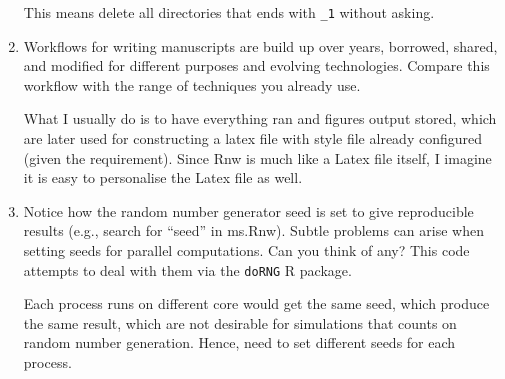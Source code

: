 \documentclass[12pt]{article}\usepackage[]{graphicx}\usepackage[]{color}
\begin{document}
\begin{enumerate}
This means delete all directories that ends with \texttt{\_1} without asking.

\item Workflows for writing manuscripts are build up over years, borrowed, shared, and modified for different purposes and evolving technologies. Compare this workflow with the range of techniques you already use.

What I usually do is to have everything ran and figures output stored, which are later used for constructing a latex file with style file already configured (given the requirement). Since Rnw is much like a Latex file itself, I imagine it is easy to personalise the Latex file as well.

\item Notice how the random number generator seed is set to give reproducible results (e.g., search for ``seed'' in ms.Rnw). Subtle problems can arise when setting seeds for parallel computations. Can you think of any? This code attempts to deal with them via the \texttt{doRNG} R package.


Each process runs on different core would get the same seed, which produce the same result, which are not desirable for simulations that counts on random number generation. Hence, need to set different seeds for each process.

\end{enumerate}
\end{document}
